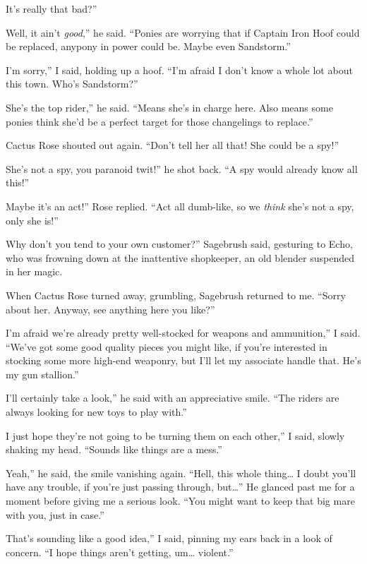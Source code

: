 \leavevmode{}It’s really that bad?”

\leavevmode{}Well, it ain’t \textit{good},” he said. “Ponies are worrying that if Captain Iron Hoof could be replaced, anypony in power could be. Maybe even Sandstorm.”

\leavevmode{}I’m sorry,” I said, holding up a hoof. “I’m afraid I don’t know a whole lot about this town. Who’s Sandstorm?”

\leavevmode{}She’s the top rider,” he said. “Means she’s in charge here. Also means some ponies think she’d be a perfect target for those changelings to replace.”

Cactus Rose shouted out again. “Don’t tell her all that! She could be a spy!”

\leavevmode{}She’s not a spy, you paranoid twit!” he shot back. “A spy would already know all this!”

\leavevmode{}Maybe it’s an act!” Rose replied. “Act all dumb-like, so we \textit{think} she’s not a spy, only she is!”

\leavevmode{}Why don’t you tend to your own customer?” Sagebrush said, gesturing to Echo, who was frowning down at the inattentive shopkeeper, an old blender suspended in her magic.

When Cactus Rose turned away, grumbling, Sagebrush returned to me. “Sorry about her. Anyway, see anything here you like?”

\leavevmode{}I’m afraid we’re already pretty well-stocked for weapons and ammunition,” I said. “We’ve got some good quality pieces you might like, if you’re interested in stocking some more high-end weaponry, but I’ll let my associate handle that. He’s my gun stallion.”

\leavevmode{}I’ll certainly take a look,” he said with an appreciative smile. “The riders are always looking for new toys to play with.”

\leavevmode{}I just hope they’re not going to be turning them on each other,” I said, slowly shaking my head. “Sounds like things are a mess.”

\leavevmode{}Yeah,” he said, the smile vanishing again. “Hell, this whole thing… I doubt you’ll have any trouble, if you’re just passing through, but…” He glanced past me for a moment before giving me a serious look. “You might want to keep that big mare with you, just in case.”

\leavevmode{}That’s sounding like a good idea,” I said, pinning my ears back in a look of concern. “I hope things aren’t getting, um… violent.”

